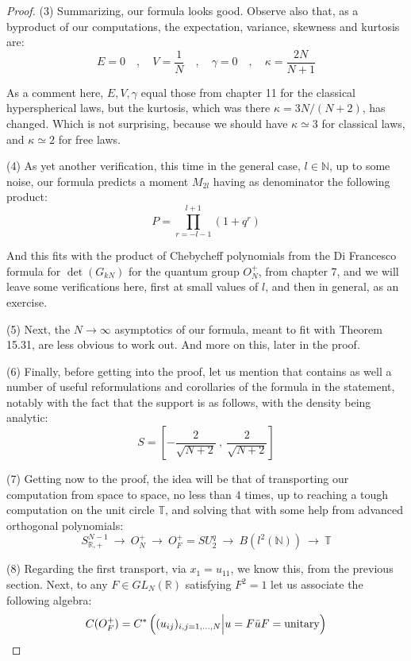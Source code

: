 \documentclass[12pt]{amsbook}
\begin{document}
\begin{proof}
(3) Summarizing, our formula looks good. Observe also that, as a byproduct of our computations, the expectation, variance, skewness and kurtosis are:
$$E=0\quad,\quad V=\frac{1}{N}\quad,\quad\gamma=0\quad,\quad\kappa=\frac{2N}{N+1}$$

As a comment here, $E,V,\gamma$ equal those from chapter 11 for the classical hyperspherical laws, but the kurtosis, which was there $\kappa=3N/(N+2)$, has changed. Which is not surprising, because we should have $\kappa\simeq3$ for classical laws, and $\kappa\simeq2$ for free laws.

\medskip

(4) As yet another verification, this time in the general case, $l\in\mathbb N$, up to some noise, our formula predicts a moment $M_{2l}$ having as denominator the following product:
$$P=\prod_{r=-l-1}^{l+1}(1+q^r)$$ 

And this fits with the product of Chebycheff polynomials from the Di Francesco formula for $\det(G_{kN})$ for the quantum group $O_N^+$, from chapter 7, and we will leave some verifications here, first at small values of $l$, and then in general, as an exercise.

\medskip

(5) Next, the $N\to\infty$ asymptotics of our formula, meant to fit with Theorem 15.31, are less obvious to work out. And more on this, later in the proof.

\medskip

(6) Finally, before getting into the proof, let us mention that \cite{bcz} contains as well a number of useful reformulations and corollaries of the formula in the statement, notably with the fact that the support is as follows, with the density being analytic:
$$S=\left[-\frac{2}{\sqrt{N+2}}\ ,\ \frac{2}{\sqrt{N+2}}\right]$$ 

(7) Getting now to the proof, the idea will be that of transporting our computation from space to space, no less than 4 times, up to reaching a tough computation on the unit circle $\mathbb T$, and solving that with some help from advanced orthogonal polynomials:
$$S^{N-1}_{\mathbb R,+}
\ \longrightarrow\ O_N^+ 
\ \longrightarrow\ O_F^+=SU_2^q
\ \longrightarrow\ B(l^2(\mathbb N))
\ \longrightarrow\ \mathbb T$$

(8) Regarding the first transport, via $x_1=u_{11}$, we know this, from the previous section. Next, to any $F\in GL_N(\mathbb R)$ satisfying $F^2=1$ let us associate the following algebra:
$$C(O_F^+)=C^*\left((u_{ij})_{i,j=1,\ldots,N}\Big|u=F\bar{u}F={\rm unitary}\right)$$


\end{proof}
\end{document}
